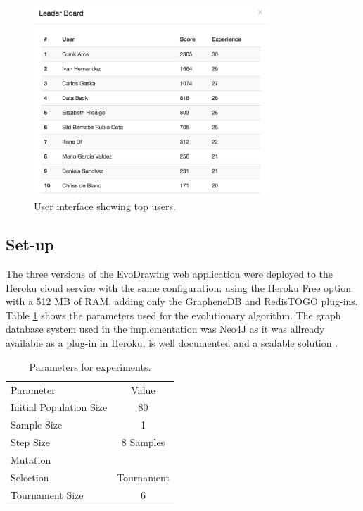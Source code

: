 \documentclass[conference]{IEEEtran}
\begin{document}
\begin{figure}[!t]
    \centering
        \includegraphics[width=3.5in]{img/leaderBoard.png}
    \caption{User interface showing top users.}
    \label{fig:top-users}
\end{figure}



\subsection{Set-up}
\label{sec:setup}

The three versions of the EvoDrawing web application were deployed to the
Heroku cloud service with the same configuration: using the
Heroku Free option with a 512 MB of RAM, adding only the GrapheneDB and RedisTOGO plug-ins.
Table \ref{tab:params} shows the parameters used for the evolutionary algorithm. The graph database 
system used in the implementation was Neo4J as it was allready available as a plug-in in Heroku, is well documented
and a scalable solution \cite{miller2013graph,holzschuher2013performance}.  

\begin{table}
  \small
  \caption{ Parameters for experiments.  }
  \label{tab:params} 
  \centering
  \small
  \begin{tabular}{l  c   }
    \hline\noalign{\smallskip}
     Parameter & Value \\
    \noalign{\smallskip}\hline\noalign{\smallskip}
    Initial Population Size   & 80 \\ \hline
    Sample Size & 1 \\ \hline
    Step Size & 8 Samples \\ \hline
    Mutation &  \\ \hline
    Selection & Tournament \\ \hline
    Tournament Size &  6 \\ \hline
  \end{tabular}
\end{table}
\end{document}

